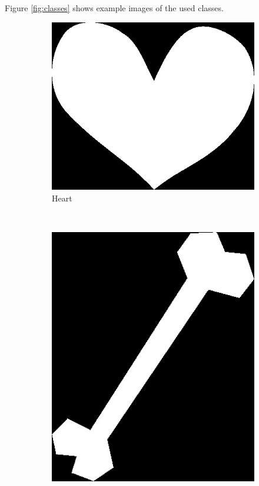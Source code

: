 \documentclass[a4paper,psfig,subfigure,epsfig,fleqn,amssmb,float,caption,fontenc,ausarbeitung]{article}
\begin{document}
Figure \ref{fig:classes} shows example images of the used classes.

\begin{figure}
	\centering
	\begin{subfigure}[b]{0.3\textwidth}
		\includegraphics[width=\textwidth]{img/Heart-1}
		\caption{Heart}
	\end{subfigure}
	~ 
	\begin{subfigure}[b]{0.3\textwidth}
		\includegraphics[width=\textwidth]{img/Bone}

\end{subfigure}
\end{figure}
\end{document}
